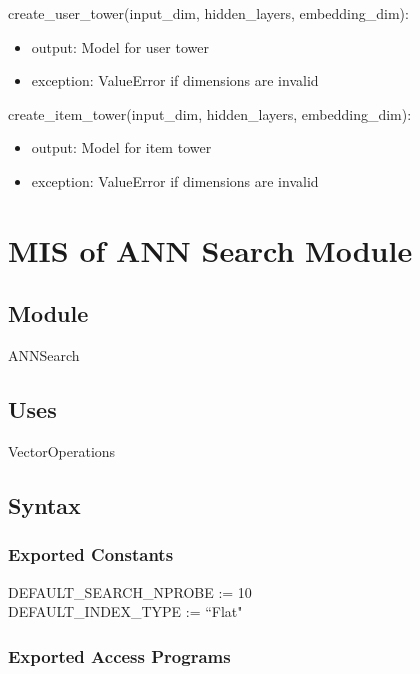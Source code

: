 \documentclass[12pt, titlepage]{article}
\begin{document}
\noindent create\_user\_tower(input\_dim, hidden\_layers, embedding\_dim):
\begin{itemize}
\item output: Model for user tower
\item exception: ValueError if dimensions are invalid
\end{itemize}

\noindent create\_item\_tower(input\_dim, hidden\_layers, embedding\_dim):
\begin{itemize}
\item output: Model for item tower
\item exception: ValueError if dimensions are invalid
\end{itemize}

\newpage

\section{MIS of ANN Search Module} \label{ModuleANN}

\subsection{Module}

ANNSearch

\subsection{Uses}
VectorOperations

\subsection{Syntax}

\subsubsection{Exported Constants}
DEFAULT\_SEARCH\_NPROBE := 10\\
DEFAULT\_INDEX\_TYPE := ``Flat"
\subsubsection{Exported Access Programs}
\end{document}
